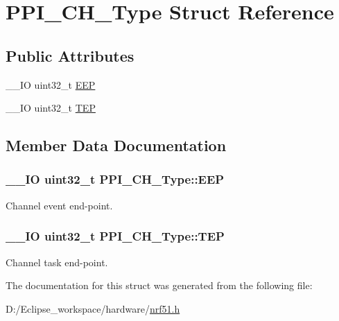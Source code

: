 \hypertarget{struct_p_p_i___c_h___type}{}\section{P\+P\+I\+\_\+\+C\+H\+\_\+\+Type Struct Reference}
\label{struct_p_p_i___c_h___type}
\subsection*{Public Attributes}
\begin{DoxyCompactItemize}
\item 
\+\_\+\+\_\+\+I\+O uint32\+\_\+t \hyperlink{struct_p_p_i___c_h___type_a53085166a2be0bf9d5c18ddb15b44d73}{E\+E\+P}
\item 
\+\_\+\+\_\+\+I\+O uint32\+\_\+t \hyperlink{struct_p_p_i___c_h___type_a17ae1dc702d843d56f53649515233693}{T\+E\+P}
\end{DoxyCompactItemize}


\subsection{Member Data Documentation}
\hypertarget{struct_p_p_i___c_h___type_a53085166a2be0bf9d5c18ddb15b44d73}{}
\subsubsection[{E\+E\+P}]{\setlength{\rightskip}{0pt plus 5cm}\+\_\+\+\_\+\+I\+O uint32\+\_\+t P\+P\+I\+\_\+\+C\+H\+\_\+\+Type\+::\+E\+E\+P}\label{struct_p_p_i___c_h___type_a53085166a2be0bf9d5c18ddb15b44d73}
Channel event end-\/point. \hypertarget{struct_p_p_i___c_h___type_a17ae1dc702d843d56f53649515233693}{}
\subsubsection[{T\+E\+P}]{\setlength{\rightskip}{0pt plus 5cm}\+\_\+\+\_\+\+I\+O uint32\+\_\+t P\+P\+I\+\_\+\+C\+H\+\_\+\+Type\+::\+T\+E\+P}\label{struct_p_p_i___c_h___type_a17ae1dc702d843d56f53649515233693}
Channel task end-\/point. 

The documentation for this struct was generated from the following file\+:\begin{DoxyCompactItemize}
\item 
D\+:/\+Eclipse\+\_\+workspace/hardware/\hyperlink{nrf51_8h}{nrf51.\+h}\end{DoxyCompactItemize}
